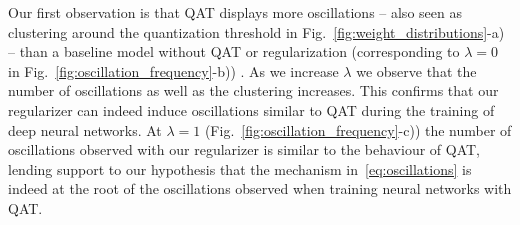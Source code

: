 Our first observation is that QAT displays more oscillations -- also seen as clustering around the quantization threshold in Fig.~\ref{fig:weight_distributions}-a) -- than a baseline model without QAT or regularization (corresponding to $\lambda = 0$ in Fig.~\ref{fig:oscillation_frequency}-b)) . As we increase $\lambda$ we observe that the number of oscillations as well as the clustering increases. This confirms that our regularizer can indeed induce oscillations similar to QAT during the training of deep neural networks. At $\lambda = 1$ (Fig.~\ref{fig:oscillation_frequency}-c)) the number of oscillations observed with our regularizer is similar to the behaviour of QAT, lending support to our hypothesis that the 
mechanism in~\eqref{eq:oscillations} is indeed at the root of the oscillations observed when training neural networks with QAT.





